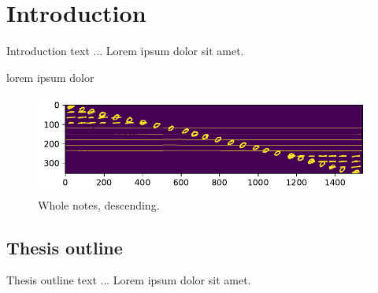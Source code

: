 \chapter*{Introduction}

Introduction text ... Lorem ipsum dolor sit amet.

\begin{code}
lorem ipsum dolor
\end{code}

\begin{figure}[h]\centering
\includegraphics[width=140mm]{../img/test_1}
\caption{Whole notes, descending.}
\label{obr03:Nhust}
\end{figure}

\section*{Thesis outline}

Thesis outline text ... Lorem ipsum dolor sit amet.
